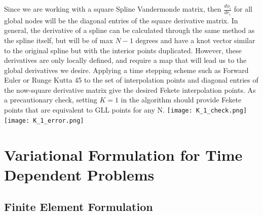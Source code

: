 \documentclass{article}
\begin{document}
Since we are working with a square Spline Vandermonde matrix, then $\frac{d\phi_i}{dr_i}$ for all global nodes will be the diagonal entries of the square derivative matrix. In general, the derivative of a spline can be calculated through the same method as the spline itself, but will be of max $N-1$ degrees and have a knot vector similar to the original spline but with the interior points duplicated. However, these derivatives are only locally defined, and require a map that will lead us to the global derivatives we desire. Applying a time stepping scheme such as Forward Euler or Runge Kutta 45 to the set of interpolation points and diagonal entries of the now-square derivative matrix give the desired Fekete interpolation points. As a precautionary check, setting $K=1$ in the algorithm should provide Fekete points that are equivalent to GLL points for any N.
\newline\newline\newline\hspace*{-0.5cm}
\texttt{[image: K\_1\_check.png]} \texttt{[image: K\_1\_error.png]}

\section*{Variational Formulation for Time Dependent Problems}
\subsection*{Finite Element Formulation}
\end{document}
